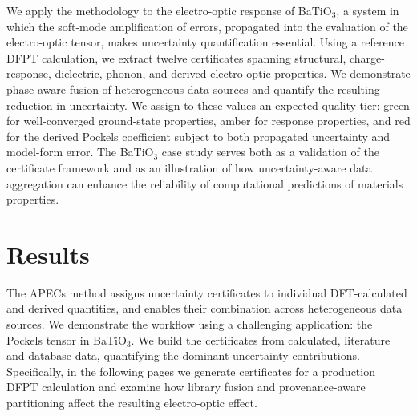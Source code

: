\documentclass[prb,twocolumn,superscriptaddress,amsmath,amssymb,longbibliography]{revtex4-2}
\begin{document}
We apply the methodology to the electro-optic response of BaTiO$_3$, a system in which the soft-mode amplification of errors, propagated into the evaluation of the electro-optic tensor, makes  uncertainty 
quantification essential. Using a reference DFPT calculation, we extract twelve 
 certificates spanning structural, charge-response, dielectric, 
phonon, and derived electro-optic properties. 
We demonstrate phase-aware fusion of heterogeneous data sources and quantify the resulting reduction in uncertainty. 
We assign to these values an expected quality tier: green for well-converged ground-state properties, amber for 
response properties, and red for the derived Pockels coefficient subject 
to both propagated uncertainty and model-form error. The BaTiO$_3$ case study serves both as a validation of the certificate framework and as an illustration of how uncertainty-aware data aggregation can enhance the reliability of computational predictions of materials properties. 


\section{Results}
\label{sec:results}



The APECs method assigns uncertainty certificates to individual DFT-calculated and derived quantities, and enables their combination across heterogeneous data sources. We demonstrate the workflow using a challenging application: the Pockels tensor in BaTiO$_3$. We build the certificates from calculated, literature and database data, quantifying the dominant uncertainty contributions. Specifically, in the following pages we generate certificates for a production DFPT calculation and examine how library fusion and provenance-aware partitioning affect the resulting electro-optic effect. 
\end{document}
